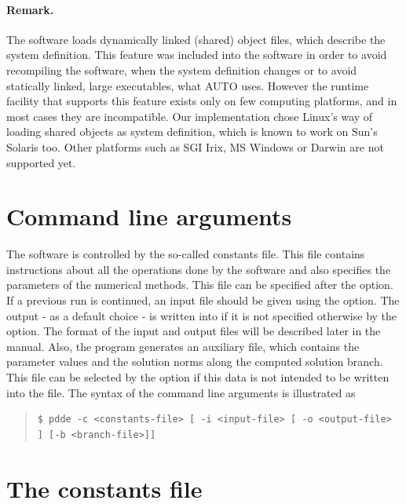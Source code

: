 \documentclass[10pt,a4paper]{ddedoc}
\begin{document}
\paragraph{Remark.} The software loads dynamically linked (shared) object files, which describe the system definition. This feature was included into the software in order to avoid recompiling the software, when the system definition changes or to avoid statically linked, large executables, what AUTO uses. However the runtime facility that supports this feature exists only on few computing platforms, and in most cases they are incompatible. Our implementation chose Linux's way of loading shared objects as system definition, which is known to work on Sun's Solaris too. Other platforms such as SGI Irix, MS Windows or Darwin are not supported yet.

\section{Command line arguments}

The software is controlled by the so-called constants file. This file contains
instructions about all the operations done by the software and also specifies the parameters of the numerical methods.
This file can be specified after the  option. If a previous run is continued, an input file should be given using the  option. The output - as a default choice - is written into  if it is not specified otherwise by the  option. The format of the input and output files will be described later in the manual. Also, the program generates an auxiliary file, which contains the parameter values and the solution norms along the computed solution branch.
This file can be selected by the  option if this data is not intended to be written into the  file. The syntax of the command line arguments is illustrated as
{ \small \begin{quote} \begin{lstlisting}[basicstyle=\tt,frame=single]
$ pdde -c <constants-file> [ -i <input-file> [ -o <output-file> ] [-b <branch-file>]]
\end{lstlisting} \end{quote} } \noindent

\section{The constants file}
\label{constfile}
\end{document}
